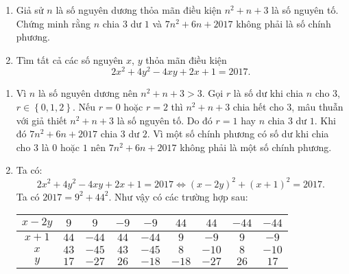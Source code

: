 \begin{ex}%
\hfill
    \begin{enumerate}    
        \item Giả sử $n$ là số nguyên dương thỏa mãn điều kiện $n^2+n+3$ là số nguyên tố. Chứng minh rằng $n$ chia $3$ dư $1$ và $7n^2+6n+2017$ không phải là số chính phương.
        \item Tìm tất cả các số nguyên $x$, $y$ thỏa mãn điều kiện 
        \[2{x}^{2}+4{y}^{2}-4xy+2x+1=2017.\]
   \end{enumerate}
\loigiai
    {
    \begin{enumerate}
        \item Vì $n$ là số nguyên dương nên $n^2+n+3>3$.
        Gọi $r$ là số dư khi chia $n$ cho $3$, $r\in \left\{ 0, 1, 2 \right\}$.                                                
        Nếu $r=0$ hoặc $r=2$ thì $n^2+n+3$ chia hết cho $3$, mâu thuẫn với giả thiết $n^2+n+3$ là số nguyên tố.
        Do đó $r=1$ hay $n$ chia $3$ dư $1$.
        Khi đó $7n^2+6n+2017$ chia $3$ dư $2$. 
        Vì một số chính phương có số dư khi chia cho $3$ là $0$ hoặc $1$
        nên $7n^2+6n+2017$ không phải là một số chính phương.        
        \item Ta có:
        \[2x^{2}+4{y}^{2}-4xy+2x+1=2017\Leftrightarrow {\left( x-2y \right)}^{2}+{(x+1)}^{2}=2017.\]
        Ta có $2017={{9}^{2}}+{{44}^{2}}$.
        Như vậy có các trường hợp sau:
     \begin{center}
    \begin{tabular}{|l|l|l|l|l|l|l|l|l|}
    	\hline
    	\multicolumn{1}{|c|}{$x-2y$} & \multicolumn{1}{c|}{$9$} & \multicolumn{1}{c|}{$9$} & \multicolumn{1}{c|}{$-9$} & \multicolumn{1}{c|}{$-9$} & \multicolumn{1}{c|}{$44$} & \multicolumn{1}{c|}{$44$} & \multicolumn{1}{c|}{$-44$} & \multicolumn{1}{c|}{$-44$} \\ 
    	\hline
    	\multicolumn{1}{|c|}{$x+1$} & \multicolumn{1}{c|}{$44$} & \multicolumn{1}{c|}{$-44$} & \multicolumn{1}{c|}{$44$} & \multicolumn{1}{c|}{$-44$} & \multicolumn{1}{c|}{$9$} & \multicolumn{1}{c|}{$-9$} & \multicolumn{1}{c|}{$9$} & \multicolumn{1}{c|}{$-9$} \\ 
    	\hline
    	\multicolumn{1}{|c|}{$x$} & \multicolumn{1}{c|}{$43$} & \multicolumn{1}{c|}{$-45$} & \multicolumn{1}{c|}{$43$} & \multicolumn{1}{c|}{$-45$} & \multicolumn{1}{c|}{$8$} & \multicolumn{1}{c|}{$-10$} & \multicolumn{1}{c|}{$8$} & \multicolumn{1}{c|}{$-10$} \\ 
    	\hline
    	\multicolumn{1}{|c|}{$y$} & \multicolumn{1}{c|}{$17$} & \multicolumn{1}{c|}{$-27$} & \multicolumn{1}{c|}{$26$} & \multicolumn{1}{c|}{$-18$} & \multicolumn{1}{c|}{$-18$} & \multicolumn{1}{c|}{$-27$} & \multicolumn{1}{c|}{$26$} & \multicolumn{1}{c|}{$17$} \\ 
    	\hline
    \end{tabular}
    \end{center}    
    \end{enumerate}
    }
\end{ex}

